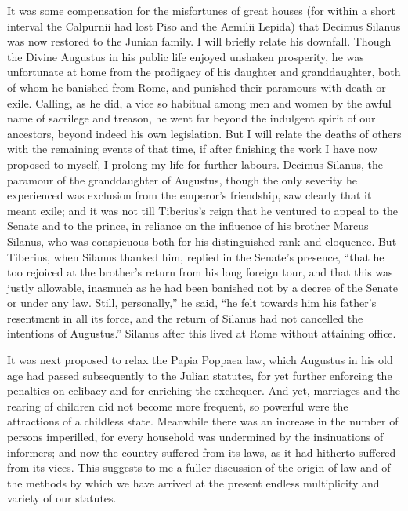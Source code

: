 It was some compensation for the misfortunes of great houses (for within a short interval the Calpurnii had lost Piso and the Aemilii Lepida) that Decimus Silanus was now restored to the Junian family. I will briefly relate his downfall. Though the Divine Augustus in his public life enjoyed unshaken prosperity, he was unfortunate at home from the profligacy of his daughter and granddaughter, both of whom he banished from Rome, and punished their paramours with death or exile. Calling, as he did, a vice so habitual among men and women by the awful name of sacrilege and treason, he went far beyond the indulgent spirit of our ancestors, beyond indeed his own legislation. But I will relate the deaths of others with the remaining events of that time, if after finishing the work I have now proposed to myself, I prolong my life for further labours. Decimus Silanus, the paramour of the granddaughter of Augustus, though the only severity he experienced was exclusion from the emperor's friendship, saw clearly that it meant exile; and it was not till Tiberius's reign that he ventured to appeal to the Senate and to the prince, in reliance on the influence of his brother Marcus Silanus, who was conspicuous both for his distinguished rank and eloquence. But Tiberius, when Silanus thanked him, replied in the Senate's presence, ``that he too rejoiced at the brother's return from his long foreign tour, and that this was justly allowable, inasmuch as he had been banished not by a decree of the Senate or under any law. Still, personally,'' he said, ``he felt towards him his father's resentment in all its force, and the return of Silanus had not cancelled the intentions of Augustus.'' Silanus after this lived at Rome without attaining office.


It was next proposed to relax the Papia Poppaea law, which Augustus in his old age had passed subsequently to the Julian statutes, for yet further enforcing the penalties on celibacy and for enriching the exchequer. And yet, marriages and the rearing of children did not become more frequent, so powerful were the attractions of a childless state. Meanwhile there was an increase in the number of persons imperilled, for every household was undermined by the insinuations of informers; and now the country suffered from its laws, as it had hitherto suffered from its vices. This suggests to me a fuller discussion of the origin of law and of the methods by which we have arrived at the present endless multiplicity and variety of our statutes.

